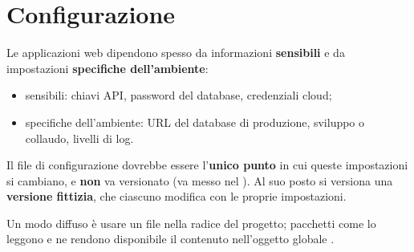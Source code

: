 \section{Configurazione}

Le applicazioni web dipendono spesso da informazioni \textbf{sensibili} e da
impostazioni \textbf{specifiche dell'ambiente}:

\begin{itemize}
  \item sensibili: chiavi API, password del database, credenziali cloud;
  \item specifiche dell'ambiente: URL del database di produzione, sviluppo o
        collaudo, livelli di log.
\end{itemize}


Il file di configurazione dovrebbe essere l'\textbf{unico punto} in cui queste
impostazioni si cambiano, e \textbf{non} va versionato (va messo nel
). Al suo posto si versiona una \textbf{versione fittizia}, che
ciascuno modifica con le proprie impostazioni.

Un modo diffuso è usare un file  nella radice del progetto; pacchetti
come  lo leggono e ne rendono disponibile il contenuto
nell'oggetto globale .

